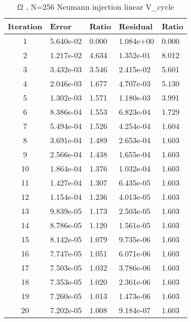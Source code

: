 \documentclass[12]{article}%
\begin{document}
    
    \begin{table}[H]
        \centering
        \caption{f2 , N=256  Neumann injection linear V\_cycle}
        \begin{tabular}{|c|l|l|l|l|}
        \hline
        Iteration & Error       & Ratio     & Residual    & Ratio     \\ \hline
 1 & 5.640e-02 & 0.000 & 1.084e+00 & 0.000\\ \hline 
 2 & 1.217e-02 & 4.634 & 1.352e-01 & 8.012\\ \hline 
 3 & 3.432e-03 & 3.546 & 2.415e-02 & 5.601\\ \hline 
 4 & 2.046e-03 & 1.677 & 4.707e-03 & 5.130\\ \hline 
 5 & 1.302e-03 & 1.571 & 1.180e-03 & 3.991\\ \hline 
 6 & 8.386e-04 & 1.553 & 6.823e-04 & 1.729\\ \hline 
 7 & 5.494e-04 & 1.526 & 4.254e-04 & 1.604\\ \hline 
 8 & 3.691e-04 & 1.489 & 2.653e-04 & 1.603\\ \hline 
 9 & 2.566e-04 & 1.438 & 1.655e-04 & 1.603\\ \hline 
 10 & 1.864e-04 & 1.376 & 1.032e-04 & 1.603\\ \hline 
 11 & 1.427e-04 & 1.307 & 6.435e-05 & 1.603\\ \hline 
 12 & 1.154e-04 & 1.236 & 4.013e-05 & 1.603\\ \hline 
 13 & 9.839e-05 & 1.173 & 2.503e-05 & 1.603\\ \hline 
 14 & 8.786e-05 & 1.120 & 1.561e-05 & 1.603\\ \hline 
 15 & 8.142e-05 & 1.079 & 9.735e-06 & 1.603\\ \hline 
 16 & 7.747e-05 & 1.051 & 6.071e-06 & 1.603\\ \hline 
 17 & 7.503e-05 & 1.032 & 3.786e-06 & 1.603\\ \hline 
 18 & 7.353e-05 & 1.020 & 2.361e-06 & 1.603\\ \hline 
 19 & 7.260e-05 & 1.013 & 1.473e-06 & 1.603\\ \hline 
 20 & 7.202e-05 & 1.008 & 9.184e-07 & 1.603\\ \hline    \end{tabular}
        \end{table}
\end{document}
